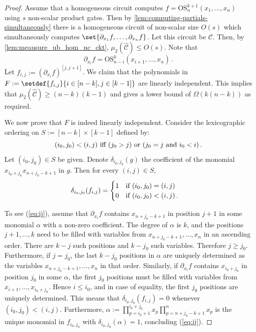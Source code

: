 \documentclass[11pt]{article}
\newcommand{\ckt}{\textbf{$\mathcal{C}$}}
\newcommand{\esym}[2]{\mathrm{OS}_{#1}^{#2}}
\begin{document}
\begin{proof} 
  Assume that a homogeneous circuit computes $f = \esym{n}{k+1}(x_1,\dots,x_n)$ using $s$ non-scalar product gates.  
  Then by \autoref{lem:computing-partials-simultaneously} there is a homogeneous  circuit of non-scalar size $O(s)$ which simultaneously computes $\set{\partial_{x_1}f, \ldots, \partial_{x_{n}}f}$.
  Let this circuit be $\ckt$.
  Then, by \autoref{lem:meausure_ub_hom_nc_ckt}, $\mu_2(\widehat {\ckt}) \leq O(s)$. 
  Note that
  \[
    \partial_{x_i}f = \esym{n-i}{k}(x_{i+1}, \ldots, x_n)\,.
  \]
  Let $f_{i,j}:=(\partial_{x_i}f)^{[j,j+1]}$.  
  We claim that the polynomials in  $F:=\setdef{f_{i,j}}{i \in [n- k], j \in [k-1]}$ are linearly independent. 
  This implies  that $\mu_2(\widehat{\ckt}) \geq (n-k)(k-1)$ and gives a lower bound of $\Omega(k(n-k))$ as required.
  
  We now prove that $F$ is indeed linearly independent. Consider the lexicographic ordering on $S:=[n-k]\times [k-1]$ defined by: 
  \[( i_0, j_0) < (i,j) \hbox{ iff } (j_0 > 
  j) \hbox{ or } (j_0=j  \hbox{ and } i_0< i)\,.\] 
  Let $(i_0,j_0)\in S$ be given. 
  Denote $\delta_{i_0,j_0}(g)$ the coefficient of 
  the monomial $x_{i_0+j_0}x_{n+j_0-k+1}$ in $g$. Then for every $(i,j)\in S$, 
  \begin{equation}\label{eq:ij}
    \delta_{i_0,j_0}(f_{i,j}) =
    \begin{cases}
      1 \text{\quad if $(i_0,j_0) = (i,j)$}\,\\
      0 \text{\quad if $(i_0,j_0) < (i,j)$}\,.
    \end{cases}
  \end{equation}

  To see (\ref{eq:ij}), assume that $\partial_{x_i}f$ contains $x_{n+j_0-k+1}$ in position $j+1$ in some monomial $\alpha$ with a non-zero coefficient.  
  The degree of $\alpha$ is $k$, and the positions $j+1,\dots, k$  need to be filled with variables from $x_{n+j_0-k+1},\dots,x_n$ in an ascending order. 
  There are $k-j$ such positions and $k-j_0$ such variables. 
  Therefore $j\geq j_0$. 
  Furthermore, if $j=j_0$, the last $k-j_0$ positions in $\alpha$ are uniquely determined as the variables $x_{n+j_0-k+1},\dots,x_n$ in that order. 
  Similarly, if $\partial_{x_{i}}f$ contains $x_{i_0+j_0}$ in position $j_0$ in some $\alpha$, the first $j_0$ positions must be filled with variables from $x_{i+1},\dots, x_{i_0+j_0} $. 
  Hence $i\leq i_0$, and in case of equality, the first $j_0$ positions are uniquely determined. 
  This means that $ \delta_{i_0,j_0}(f_{i,j})=0$ whenever $(i_0,j_0) < (i,j)$. 
  Furthermore, $\alpha:=\prod_{p=i_0+1}^{i_0+ j_0}x_{p}\prod_{p= n+j_0-k+1}^n x_p$  is the unique monomial in $f_{i_0,j_0}$ with $\delta_{i_0,j_0}(\alpha)=1$, concluding (\ref{eq:ij}).   
   

\end{proof}
\end{document}
